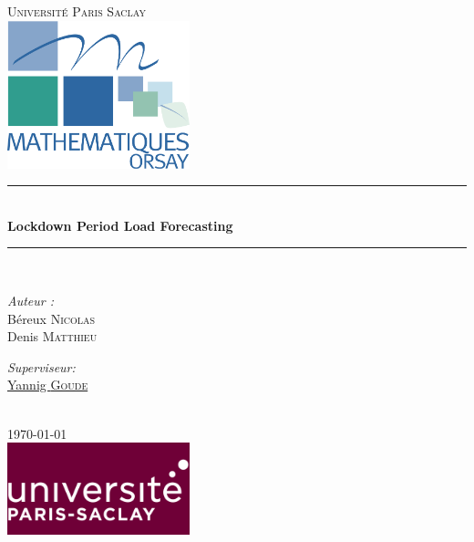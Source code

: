 \documentclass{article}
\begin{document}

\hypersetup{pageanchor=false}
\begin{titlepage}
	\newcommand{\HRule}{\rule{\linewidth}{0.5mm}}
	\centering
	\textsc{\LARGE Université Paris Saclay}\\[1.5cm]
	\includegraphics[width=200px]{img/LogoMathOrsay.png}
	\HRule \\[0.4cm]
	{ \huge \bfseries\centering Lockdown Period Load Forecasting}\\[0.4cm]
	\HRule \\[1.5cm]
	\begin{minipage}{0.4\textwidth}
		\begin{flushleft} \large
			\emph{Auteur :}\\
			Béreux \textsc{Nicolas}
			\\
			Denis \textsc{Matthieu}
		\end{flushleft}
	\end{minipage}
	\begin{minipage}{0.4\textwidth}
		\begin{flushright} \large
			\emph{Superviseur:} \\
			\href{https://www.imo.universite-paris-saclay.fr/~goude/about.html}{Yannig \textsc{Goude}} \\
		\end{flushright}
	\end{minipage}\\[2cm]
	{\large \today}\\[2cm]
	\includegraphics[width=200px]{img/logo_Paris_saclay.png}
\end{titlepage}
\hypersetup{pageanchor=true}
\tableofcontents

\newtheorem{theorem}{Théorème}[section]
\newtheorem{corollary}[theorem]{Corollaire}
\newtheorem{lemma}[theorem]{Lemme}
\newtheorem{prop}[theorem]{Proposition}
\newtheorem{example}[theorem]{Exemple}
\theoremstyle{definition}
\newtheorem{definition}{Définition}
\theoremstyle{remark}
\newtheorem*{remark}{Remarque}
\pagebreak
\end{document}
